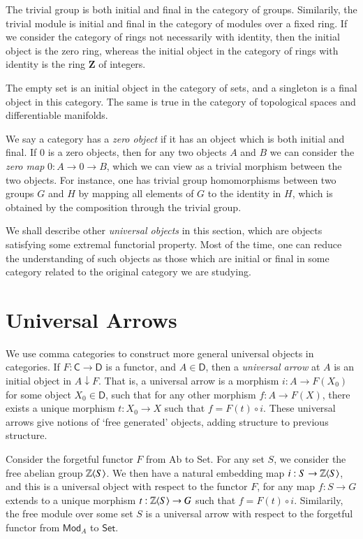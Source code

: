 \begin{example}
    The trivial group is both initial and final in the category of groups. Similarily, the trivial module is initial and final in the category of modules over a fixed ring. If we consider the category of rings not necessarily with identity, then the initial object is the zero ring, whereas the initial object in the category of rings with identity is the ring $\mathbf{Z}$ of integers.
\end{example}

\begin{example}
    The empty set is an initial object in the category of sets, and a singleton is a final object in this category. The same is true in the category of topological spaces and differentiable manifolds.
\end{example}

We say a category has a \emph{zero object} if it has an object which is both initial and final. If $0$ is a zero objects, then for any two objects $A$ and $B$ we can consider the \emph{zero map} $0: A \to 0 \to B$, which we can view as a trivial morphism between the two objects. For instance, one has trivial group homomorphisms between two groups $G$ and $H$ by mapping all elements of $G$ to the identity in $H$, which is obtained by the composition through the trivial group.

We shall describe other \emph{universal objects} in this section, which are objects satisfying some extremal functorial property. Most of the time, one can reduce the understanding of such objects as those which are initial or final in some category related to the original category we are studying.

\section{Universal Arrows}

We use comma categories to construct more general universal objects in categories. If $F: \mathsf{C} \to \mathsf{D}$ is a functor, and $A \in \mathsf{D}$, then a \emph{universal arrow} at $A$ is an initial object in $A \downarrow F$. That is, a universal arrow is a morphism $i: A \to F(X_0)$ for some object $X_0 \in \mathsf{D}$, such that for any other morphism $f: A \to F(X)$, there exists a unique morphism $t: X_0 \to X$ such that $f = F(t) \circ i$. These universal arrows give notions of `free generated' objects, adding structure to previous structure.

\begin{example}
    Consider the forgetful functor $F$ from {\sf Ab} to {\sf Set}. For any set $S$, we consider the free abelian group $\operatorname{\mathbb{Z}} \langle S \rangle$. We then have a natural embedding map $i: S \to \operatorname{\mathbb{Z}} \langle S \rangle$, and this is a universal object with respect to the functor $F$, for any map $f: S \to G$ extends to a unique morphism $t: \operatorname{\mathbb{Z}} \langle S \rangle \to G$ such that $f = F(t) \circ i$. Similarily, the free module over some set $S$ is a universal arrow with respect to the forgetful functor from $\mathsf{Mod}_A$ to $\mathsf{Set}$.
\end{example}

